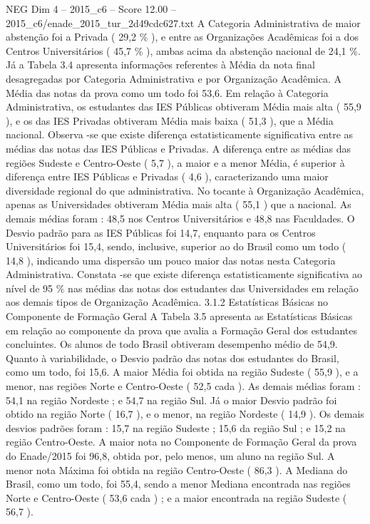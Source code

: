 \begin{textsample}{NEG Dim 4 – 2015\_c6 – Score 12.00 – 2015\_c6/enade\_2015\_tur\_2d49cdc627.txt}
A Categoria Administrativa de maior abstenção foi a Privada ( 29,2 \% ), e entre as Organizações Acadêmicas foi a dos Centros Universitários ( 45,7 \% ), ambas acima da abstenção nacional de 24,1 \%.
Já a Tabela 3.4 apresenta informações referentes à Média da nota final desagregadas por Categoria Administrativa e por Organização Acadêmica.
A Média das notas da prova como um todo foi 53,6.
Em relação à Categoria Administrativa, os estudantes das IES Públicas obtiveram Média mais alta ( 55,9 ), e os das IES Privadas obtiveram Média mais baixa ( 51,3 ), que a Média nacional.
Observa -se que existe diferença estatisticamente significativa entre as médias das notas das IES Públicas e Privadas.
A diferença entre as médias das regiões Sudeste e Centro-Oeste ( 5,7 ), a maior e a menor Média, é superior à diferença entre IES Públicas e Privadas ( 4,6 ), caracterizando uma maior diversidade regional do que administrativa.
No tocante à Organização Acadêmica, apenas as Universidades obtiveram Média mais alta ( 55,1 ) que a nacional.
As demais médias foram : 48,5 nos Centros Universitários e 48,8 nas Faculdades.
O Desvio padrão para as IES Públicas foi 14,7, enquanto para os Centros Universitários foi 15,4, sendo, inclusive, superior ao do Brasil como um todo ( 14,8 ), indicando uma dispersão um pouco maior das notas nesta Categoria Administrativa.
Constata -se que existe diferença estatisticamente significativa ao nível de 95 \% nas médias das notas dos estudantes das Universidades em relação aos demais tipos de Organização Acadêmica. 3.1.2 Estatísticas Básicas no Componente de Formação Geral A Tabela 3.5 apresenta as Estatísticas Básicas em relação ao componente da prova que avalia a Formação Geral dos estudantes concluintes.
Os alunos de todo Brasil obtiveram desempenho médio de 54,9.
Quanto à variabilidade, o Desvio padrão das notas dos estudantes do Brasil, como um todo, foi 15,6.
A maior Média foi obtida na região Sudeste ( 55,9 ), e a menor, nas regiões Norte e Centro-Oeste ( 52,5 cada ).
As demais médias foram : 54,1 na região Nordeste ; e 54,7 na região Sul.
Já o maior Desvio padrão foi obtido na região Norte ( 16,7 ), e o menor, na região Nordeste ( 14,9 ).
Os demais desvios padrões foram : 15,7 na região Sudeste ; 15,6 da região Sul ; e 15,2 na região Centro-Oeste.
A maior nota no Componente de Formação Geral da prova do Enade/2015 foi 96,8, obtida por, pelo menos, um aluno na região Sul.
A menor nota Máxima foi obtida na região Centro-Oeste ( 86,3 ).
A Mediana do Brasil, como um todo, foi 55,4, sendo a menor Mediana encontrada nas regiões Norte e Centro-Oeste ( 53,6 cada ) ; e a maior encontrada na região Sudeste ( 56,7 ).

\end{textsample}
